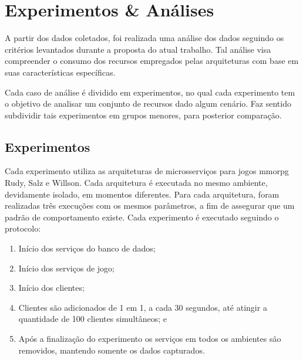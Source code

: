 \chapter{Experimentos \& Análises}
\label{cap6}



A partir dos dados coletados, foi realizada uma análise dos dados seguindo os critérios levantados durante a proposta do atual trabalho.
%
Tal análise visa compreender o consumo dos recursos empregados pelas arquiteturas com base em suas características específicas.



Cada caso de análise é dividido em experimentos, no qual cada experimento tem o objetivo de analisar um conjunto de recursos dado algum cenário.
%
Faz sentido subdividir tais experimentos em grupos menores, para posterior comparação.





\section{Experimentos}
\label{sec:experimentos}

Cada experimento utiliza as arquiteturas de microsserviços para jogos \ac{mmorpg} Rudy, Salz e Willson.
%
Cada arquitetura é executada no mesmo ambiente, devidamente isolado, em momentos diferentes.
%
Para cada arquitetura, foram realizadas três execuções com os mesmos parâmetros, a fim de assegurar que um padrão de comportamento existe.
%
Cada  experimento é executado seguindo o protocolo:


\begin{enumerate}
 \item Início dos serviços do banco de dados;
 \item Início dos serviços de jogo;
 \item Início dos clientes;
 \item Clientes são adicionados de 1 em 1, a cada 30 segundos, até atingir a quantidade de 100 clientes simultâneos; e
 \item Após a finalização do experimento os serviços em todos os ambientes são removidos, mantendo somente os dados capturados.
\end{enumerate}


